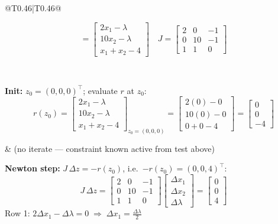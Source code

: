 \documentclass[10pt,a3paper]{article}
\begin{document}
\begin{tabular}{@{}T{0.46\linewidth}|T{0.46\linewidth}@{}}
\begin{minipage}[t]{\linewidth}
\[    = \begin{bmatrix} 2x_1-\lambda \\ 10x_2-\lambda \\ x_1+x_2-4 \end{bmatrix}
  \quad
  J = \begin{bmatrix} 2&0&-1\\0&10&-1\\1&1&0 \end{bmatrix}
\]
\end{minipage}
\\\hline
\begin{minipage}[t]{\linewidth}
\textbf{Init:} $z_0=(0,0,0)^\top$; evaluate $r$ at $z_0$:
\[
  r(z_0) = \begin{bmatrix}2x_1-\lambda\\10x_2-\lambda\\x_1+x_2-4\end{bmatrix}_{z_0=(0,0,0)}
  = \begin{bmatrix}2(0)-0\\10(0)-0\\0+0-4\end{bmatrix}
  = \begin{bmatrix}0\\0\\-4\end{bmatrix}
\]
\end{minipage}
&
{\footnotesize (no iterate — constraint known active from test above)}
\\[3pt]\hline
\begin{minipage}[t]{\linewidth}
\textbf{Newton step:} $J\,\Delta z=-r(z_0)$, i.e.\ $-r(z_0)=(0,0,4)^\top$:
\[
  J\,\Delta z =
  \begin{bmatrix}2&0&-1\\0&10&-1\\1&1&0\end{bmatrix}
  \begin{bmatrix}\Delta x_1\\\Delta x_2\\\Delta\lambda\end{bmatrix}
  =\begin{bmatrix}0\\0\\4\end{bmatrix}
\]
Row 1: $2\Delta x_1-\Delta\lambda=0 \;\Rightarrow\; \Delta x_1=\tfrac{\Delta\lambda}{2}$


\end{minipage}
\end{tabular}
\end{document}
